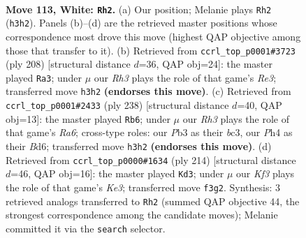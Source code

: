\documentclass[11pt]{article}
\begin{document}
\clearpage

\begin{figure}[p]\centering
\begin{subfigure}{0.46\textwidth}\centering
\resizebox{\linewidth}{!}{%
\newchessgame
\chessboard[
  setfen={8/1k6/p5r1/P1p2p1p/1p3P1P/1P2PKPR/8/8 w - - 13 113},
  showmover=false,
  pgfstyle=straightmove, color=movearrow, markmove={h3-h2}
]}
\caption{}
\end{subfigure}\hfill
\begin{subfigure}{0.46\textwidth}\centering
\resizebox{\linewidth}{!}{%
\newchessgame
\chessboard[
  setfen={8/5pk1/4p3/4Pp1p/5P1P/4R1PK/5r2/8 w - - 93 105},
  showmover=false,
  pgfstyle=straightmove, color=movearrow, markmove={e3-a3}
]}
\caption{}
\end{subfigure}
\\[4pt]
\begin{subfigure}{0.46\textwidth}\centering
\resizebox{\linewidth}{!}{%
\newchessgame
\chessboard[
  setfen={8/5k2/R2B2p1/3r1pPp/5P1P/2b2PK1/8/8 w - - 21 120},
  showmover=false,
  pgfstyle=straightmove, color=movearrow, markmove={a6-b6}
]}
\caption{}
\end{subfigure}\hfill
\begin{subfigure}{0.46\textwidth}\centering
\resizebox{\linewidth}{!}{%
\newchessgame
\chessboard[
  setfen={8/2p5/3p2pk/3Pp1p1/2P1P3/1R2KP1P/2r5/8 w - - 33 108},
  showmover=false,
  pgfstyle=straightmove, color=movearrow, markmove={e3-d3}
]}
\caption{}
\end{subfigure}
\caption{\textbf{Move 113, White: \texttt{Rh2}.} (a) Our position; Melanie plays \texttt{Rh2} (\texttt{h3h2}). Panels (b)--(d) are the retrieved master positions whose correspondence most drove this move (highest QAP objective among those that transfer to it). (b) Retrieved from \texttt{ccrl\_top\_p0001\#3723} (ply 208) [structural distance $d$=36, QAP obj=24]: the master played \texttt{Ra3}; under $\mu$ our \emph{Rh3} plays the role of that game's \emph{Re3}; transferred move \texttt{h3h2} \textbf{(endorses this move)}. (c) Retrieved from \texttt{ccrl\_top\_p0001\#2433} (ply 238) [structural distance $d$=40, QAP obj=13]: the master played \texttt{Rb6}; under $\mu$ our \emph{Rh3} plays the role of that game's \emph{Ra6}; cross-type roles: our \emph{P}b3 as their \emph{b}c3, our \emph{P}h4 as their \emph{B}d6; transferred move \texttt{h3h2} \textbf{(endorses this move)}. (d) Retrieved from \texttt{ccrl\_top\_p0000\#1634} (ply 214) [structural distance $d$=46, QAP obj=16]: the master played \texttt{Kd3}; under $\mu$ our \emph{Kf3} plays the role of that game's \emph{Ke3}; transferred move \texttt{f3g2}. Synthesis: 3 retrieved analogs transferred to \texttt{Rh2} (summed QAP objective 44, the strongest correspondence among the candidate moves); Melanie committed it via the \texttt{search} selector.}
\label{fig:thought-m224}
\end{figure}
\end{document}
